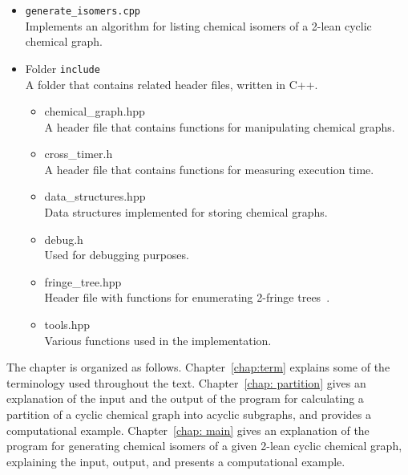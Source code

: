 \documentclass[11pt,titlepage,dvipdfmx,twoside]{book}
\begin{document}
{\begin{itemize}
\begin{itemize}
\begin{itemize}
		    \item{ \tt generate\_isomers.cpp}\\
			    Implements an algorithm for listing chemical isomers of
			    a 2-lean cyclic chemical graph.

	\item Folder {\tt include}\\
		A folder that contains related header files, written in C++.
		\begin{itemize}
			\item{chemical\_graph.hpp}\\
			  A header file that contains functions for manipulating 
			  chemical graphs.
			\item{cross\_timer.h}\\
				A header file that contains functions for measuring execution time.
				
			\item{data\_structures.hpp}\\
				Data structures implemented for storing chemical graphs.
				
			\item{debug.h}\\
				Used for debugging purposes.
				
			\item{fringe\_tree.hpp}\\
				Header file with functions for enumerating 2-fringe trees~\cite{AN20}.
				
			\item{tools.hpp}\\
				Various functions used in the implementation.
		\end{itemize}
		\end{itemize}
	  \end{itemize}
      \end{itemize}
}

The chapter is organized as follows.
Chapter~\ref{chap:term} explains some of the terminology used throughout the text.
Chapter~\ref{chap: partition} gives an explanation of the input and the output of
the program for calculating a partition of a cyclic chemical graph into
acyclic subgraphs, and provides a computational example.
Chapter~\ref{chap: main}
gives an explanation of the program for generating chemical isomers of
a given 2-lean cyclic chemical graph, explaining the input, output, and
presents a computational example.


\end{document}
